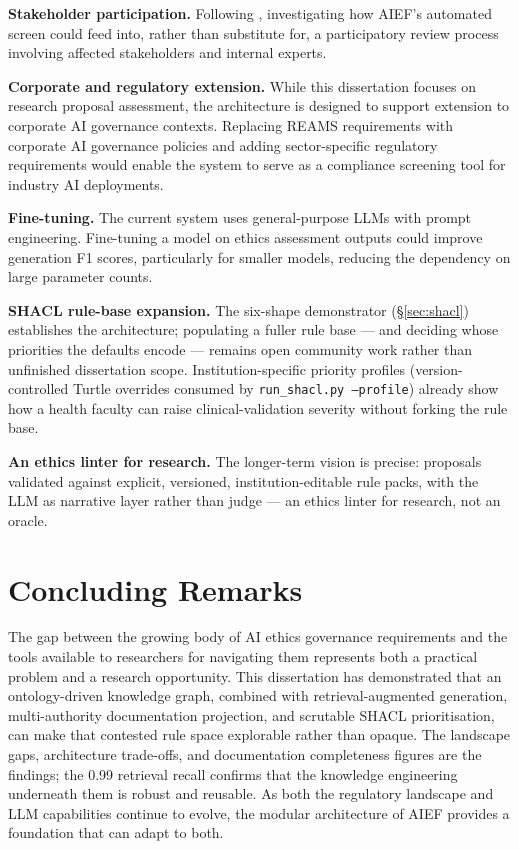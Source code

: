 \textbf{Stakeholder participation.} Following \cite{jarvers2026engaged,ullstein2026pafria}, investigating how AIEF's automated screen could feed into, rather than substitute for, a participatory review process involving affected stakeholders and internal experts.

\textbf{Corporate and regulatory extension.} While this dissertation focuses on research proposal assessment, the architecture is designed to support extension to corporate AI governance contexts. Replacing REAMS requirements with corporate AI governance policies and adding sector-specific regulatory requirements would enable the system to serve as a compliance screening tool for industry AI deployments.

\textbf{Fine-tuning.} The current system uses general-purpose LLMs with prompt engineering. Fine-tuning a model on ethics assessment outputs could improve generation F1 scores, particularly for smaller models, reducing the dependency on large parameter counts.

\textbf{SHACL rule-base expansion.} The six-shape demonstrator (\S\ref{sec:shacl}) establishes the architecture; populating a fuller rule base --- and deciding whose priorities the defaults encode --- remains open community work rather than unfinished dissertation scope. Institution-specific priority profiles (version-controlled Turtle overrides consumed by \texttt{run\_shacl.py --profile}) already show how a health faculty can raise clinical-validation severity without forking the rule base.

\textbf{An ethics linter for research.} The longer-term vision is precise: proposals validated against explicit, versioned, institution-editable rule packs, with the LLM as narrative layer rather than judge --- an ethics linter for research, not an oracle.


\section{Concluding Remarks}

The gap between the growing body of AI ethics governance requirements and the tools available to researchers for navigating them represents both a practical problem and a research opportunity. This dissertation has demonstrated that an ontology-driven knowledge graph, combined with retrieval-augmented generation, multi-authority documentation projection, and scrutable SHACL prioritisation, can make that contested rule space explorable rather than opaque. The landscape gaps, architecture trade-offs, and documentation completeness figures are the findings; the 0.99 retrieval recall confirms that the knowledge engineering underneath them is robust and reusable. As both the regulatory landscape and LLM capabilities continue to evolve, the modular architecture of AIEF provides a foundation that can adapt to both.
